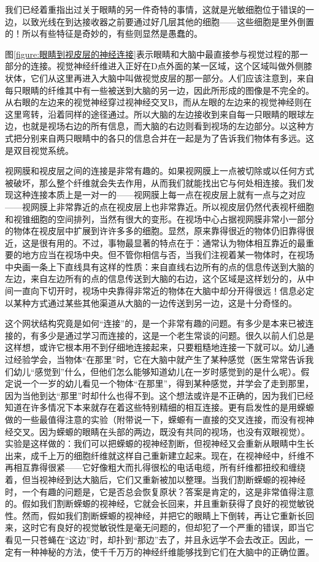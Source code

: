 我们已经着重指出过关于眼睛的另一件奇特的事情，这就是光敏细胞位于错误的一边，以致光线在到达接收器之前要通过好几层其他的细胞——这些细胞是里外倒置的！所以有些特征是奇妙的，有些则显然是愚蠢的。

图\ref{figure:眼睛到视皮层的神经连接}表示眼睛和大脑中最直接参与视觉过程的那一部分的连接。视觉神经纤维进入正好在D点外面的某一区域，这个区域叫做外侧膝状体，它们从这里再进入大脑中叫做视觉皮层的那一部分。人们应该注意到，来自每只眼睛的纤维其中有一些被送到大脑的另一边，因此所形成的图像是不完全的。从右眼的左边来的视觉神经穿过视神经交叉B，而从左眼的左边来的视觉神经则在这里弯转，沿着同样的途径通过。所以大脑的左边接收到来自每一只眼睛的眼球左边，也就是视场右边的所有信息，而大脑的右边则看到视场的左边部分。以这种方式把分别来自两只眼睛中的各只的信息合并在一起是为了告诉我们物体有多远。这是双目视觉系统。

视网膜和视皮层之间的连接是非常有趣的。如果视网膜上一点被切除或以任何方式被破坏，那么整个纤维就会失去作用，从而我们就能找出它与何处相连接。我们发现这种连接本质上是一对一的——视网膜上每一点在视皮层上就有一点与之对应——视网膜上非常靠近的点在视皮层上也非常靠近。所以视皮层仍然代表视杆细胞和视锥细胞的空间排列，当然有很大的变形。在视场中心占据视网膜非常小一部分的物体在视皮层中扩展到许许多多的细胞。显然，原来靠得很近的物体仍旧靠得很近，这是很有用的。不过，事物最显著的特点在于：通常认为物体相互靠近的最重要的地方应当在视场中央。但不管你相信与否，当我们注视着某一物体时，在视场中央画一条上下直线具有这样的性质：来自直线右边所有的点的信息传送到大脑的左边，来自左边所有的点的信息传送到大脑的右边，这个区域是这样划分的，从中间一直向下切开时，视场中央靠得非常近的物体在大脑中却分开得很远！信息必定以某种方式通过某些其他渠道从大脑的一边传送到另一边，这是十分奇怪的。

这个网状结构究竟是如何“连接”的，是一个非常有趣的问题。有多少是本来已被连接的，有多少是通过学习而连接的，这是一个老生常谈的问题。很久以前人们总是这样想，或许它根本用不到仔细地连接起来，只要粗糙地连接一下就可以。幼儿通过经验学会，当物体“在那里”时，它在大脑中就产生了某种感觉（医生常常告诉我们幼儿“感觉到”什么，但他们怎么能够知道幼儿在一岁时感觉到的是什么呢）。假定说一个一岁的幼儿看见一个物体“在那里”，得到某种感觉，并学会了走到那里，因为当他到达“那里”时却什么也得不到。这个想法或许是不正确的，因为我们已经知道在许多情况下本来就存在着这些特别精细的相互连接。更有启发性的是用蝾螈做的一些最值得注意的实验（附带说一下，蝾螈有一直接的交叉连接，而没有视神经交叉。因为蝾螈的眼睛在头部的两边，既没有共同的视场，也没有双眼视觉）。实验是这样做的：我们可以把蝾螈的视神经割断，但视神经又会重新从眼睛中生长出来，成千上万的细胞纤维就这样自己重新建立起来。现在，在视神经中，纤维不再相互靠得很紧——它好像粗大而扎得很松的电话电缆，所有纤维都扭绞和缠绕着，但当视神经到达大脑后，它们又重新被加以整理。当我们割断蝾螈的视神经时，一个有趣的问题是，它是否总会恢复原状？答案是肯定的，这是非常值得注意的。假如我们割断蝾螈的视神经，它就会长回来，并且重新获得了良好的视觉敏锐性。然而，假如我们割断蝾螈的视神经，并把它的眼睛上下倒转，再让它重新长回来，这时它有良好的视觉敏锐性是毫无问题的，但却犯了一个严重的错误，即当它看见一只苍蝇在“这边”时，却扑到“那边”去了，并且永远学不会去改正。因此，一定有一种神秘的方法，使千千万万的神经纤维能够找到它们在大脑中的正确位置。

